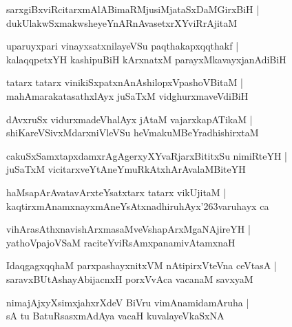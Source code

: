 \documentclass[twoside,12pt,openright]{book}
\def\S{\char'263}
\newcounter{shloka}[chapter]
\begin{document}
\begin{shloka}%
sarxgiBxviRcitarxmAlABimaRMjusiMjataSxDaMGirxBiH |\\
dukUlakwSxmakwsheyeYnARnAvasetxrXYviRrAjitaM 
\end{shloka}

\begin{shloka}%
uparuyxpari vinayxsatxnilayeVSu paqthakapxqqthakf |\\
kalaqqpetxYH kashipuBiH kArxnatxM parayxMkavayxjanAdiBiH
\end{shloka}

\begin{shloka}%
tatarx tatarx vinikiSxpatxnAnAshilopxVpashoVBitaM |\\
mahAmarakatasathxlAyx juSaTxM vidghurxmaveVdiBiH 
\end{shloka}

\begin{shloka}%
dAvxruSx vidurxmadeVhalAyx jAtaM vajarxkapATikaM |\\
shiKareVSivxMdarxniVleVSu heVmakuMBeYradhishirxtaM 
\end{shloka}

\begin{shloka}%
cakuSxSamxtapxdamxrAgAgerxyXYvaRjarxBititxSu nimiRteYH |\\
juSaTxM vicitarxveYtAneYmuRkAtxhArAvalaMBiteYH
\end{shloka}

\begin{shloka}%
haMsapArAvatavArxteYsatxtarx tatarx vikUjitaM |\\
kaqtirxmAnamxnayxmAneYsAtxnadhiruhAyx\S varuhayx ca 
\end{shloka}

\begin{shloka}%
vihArasAthxnavishArxmasaMveVshapArxMgaNAjireYH |\\
yathoVpajoVSaM raciteYviRsAmxpanamivAtamxnaH 
\end{shloka}

\begin{shloka}%
IdaqgagxqqhaM parxpashayxnitxVM nAtipirxVteVna ceVtasA |\\
saravxBUtAshayAbijacnxH porxVvAca vacanaM savxyaM
\end{shloka}

\begin{shloka}%
nimajAjxyXsimxjahxrXdeV BiVru vimAnamidamAruha |\\
sA tu BatuRsasxmAdAya vacaH kuvalayeVkaSxNA 
\end{shloka}
\end{document}

